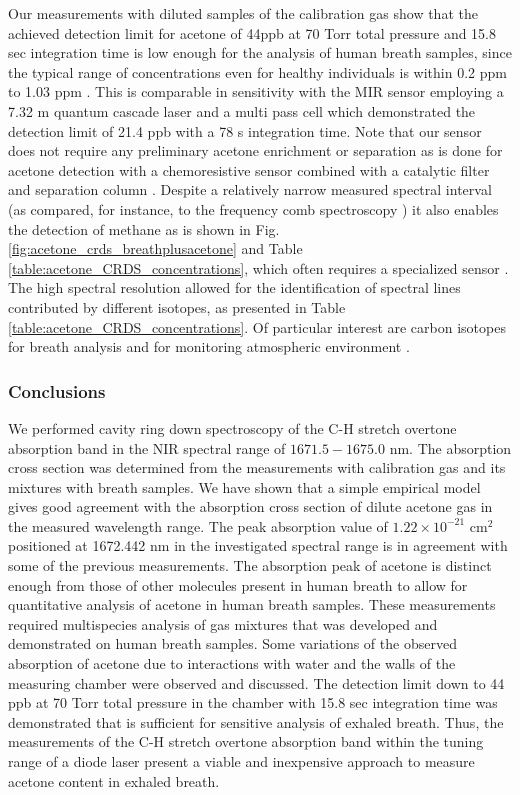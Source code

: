 \documentclass[12pt]{report}
\begin{document}
	Our measurements with diluted samples of the calibration gas show that the achieved detection limit for acetone of 44ppb at 70 Torr total pressure and 15.8 sec integration time is low enough for the analysis of human breath samples, since the typical range of concentrations even for healthy individuals is within 0.2 ppm to 1.03 ppm \cite{Wang_2013}. This is comparable in sensitivity with the MIR sensor employing a 7.32 {\textmu}m quantum cascade laser and a multi pass cell \cite{Li_2023} which demonstrated the detection limit of 21.4 ppb with a 78 s integration time. Note that our sensor does not require any preliminary acetone enrichment or separation as is done for acetone detection with a chemoresistive sensor combined with a catalytic filter and separation column \cite{Bastide_2023}. Despite a relatively narrow measured spectral interval (as compared, for instance, to the frequency comb spectroscopy \cite{ours_review_2022}) it also enables the detection of methane as is shown in Fig. \ref{fig:acetone_crds_breathplusacetone} and Table \ref{table:acetone_CRDS_concentrations}, which often requires a specialized sensor \cite{Kwasny_2023}. The high spectral resolution allowed for the identification of spectral lines contributed by different isotopes, as presented in Table \ref{table:acetone_CRDS_concentrations}. Of particular interest are carbon isotopes for breath analysis \cite{Shao_2022} and for monitoring atmospheric environment \cite{Bakkaloglu_2022}.
	
	\subsubsection{Conclusions}
	We performed cavity ring down spectroscopy of the C-H stretch overtone absorption band in the NIR spectral range of $1671.5-1675.0$ nm. The absorption cross section was determined from the measurements with calibration gas and its mixtures with breath samples. We have shown that a simple empirical model gives good agreement with the absorption cross section of dilute acetone gas in the measured wavelength range. The peak absorption value of $1.22 \times 10^{-21}\text{ cm}^2$ positioned at 1672.442 nm in the investigated spectral range is in agreement with some of the previous measurements. The absorption peak of acetone is distinct enough from those of other molecules present in human breath to allow for quantitative analysis of acetone in human breath samples. These measurements required multispecies analysis of gas mixtures that was developed and demonstrated on human breath samples. Some variations of the observed absorption of acetone due to interactions with water and the walls of the measuring chamber were observed and discussed. The detection limit down to 44 ppb at 70 Torr total pressure in the chamber with 15.8 sec integration time was demonstrated that is sufficient for sensitive analysis of exhaled breath. Thus, the measurements of the C-H stretch overtone absorption band within the tuning range of a diode laser present a viable and inexpensive approach to measure acetone content in exhaled breath.
	
\end{document}
